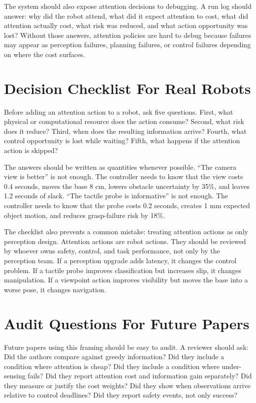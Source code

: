\documentclass{article}
\begin{document}
The system should also expose attention decisions to debugging. A run log
should answer: why did the robot attend, what did it expect attention to cost,
what did attention actually cost, what risk was reduced, and what action
opportunity was lost? Without those answers, attention policies are hard to
debug because failures may appear as perception failures, planning failures, or
control failures depending on where the cost surfaces.

\section{Decision Checklist For Real Robots}

Before adding an attention action to a robot, ask five questions. First, what
physical or computational resource does the action consume? Second, what risk
does it reduce? Third, when does the resulting information arrive? Fourth,
what control opportunity is lost while waiting? Fifth, what happens if the
attention action is skipped?

The answers should be written as quantities whenever possible. ``The camera
view is better'' is not enough. The controller needs to know that the view
costs 0.4 seconds, moves the base 8 cm, lowers obstacle uncertainty by 35\%,
and leaves 1.2 seconds of slack. ``The tactile probe is informative'' is not
enough. The controller needs to know that the probe costs 0.2 seconds, creates
1 mm expected object motion, and reduces grasp-failure risk by 18\%.

The checklist also prevents a common mistake: treating attention actions as
only perception design. Attention actions are robot actions. They should be
reviewed by whoever owns safety, control, and task performance, not only by
the perception team. If a perception upgrade adds latency, it changes the
control problem. If a tactile probe improves classification but increases slip,
it changes manipulation. If a viewpoint action improves visibility but moves
the base into a worse pose, it changes navigation.

\section{Audit Questions For Future Papers}

Future papers using this framing should be easy to audit. A reviewer should
ask: Did the authors compare against greedy information? Did they include a
condition where attention is cheap? Did they include a condition where
under-sensing fails? Did they report attention cost and information gain
separately? Did they measure or justify the cost weights? Did they show when
observations arrive relative to control deadlines? Did they report safety
events, not only success?
\end{document}

